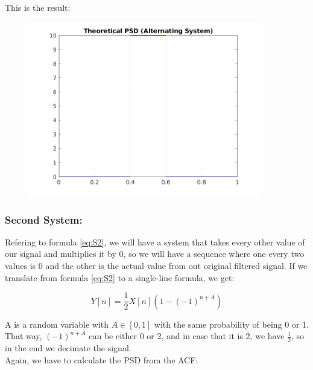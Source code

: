 \documentclass[a4paper,11pt]{article}
\begin{document}
\newpage

This is the result:

\begin{figure}[!hp]
    \begin{center}
      \includegraphics[width=0.9\textwidth]{images/study4/R_th_a.png}
    \end{center}
\end{figure}

\subsubsection{Second System:}

Refering to formula \eqref{eq:S2}, we will have a system that takes every other
value of our signal and multiplies it by 0, so we will have a sequence where
one every two values is 0 and the other is the actual value from out original
filtered signal. If we translate from formula \eqref{eq:S2} to a single-line
formula, we get:

\begin{equation}\label{eq:S2_2}
  Y[n] = \displaystyle\frac{1}{2}X[n](1-(-1)^{n+A})
\end{equation}

A is a random variable with $A \in [0,1]$ with the same probability of being 0
or 1. That way, $(-1)^{n+A}$ can be either 0 or 2, and in case that it is 2, we
have $\displaystyle\frac{1}{2}$, so in the end we decimate the signal. \\

Again, we have to calculate the PSD from the ACF:

\newpage
\end{document}
